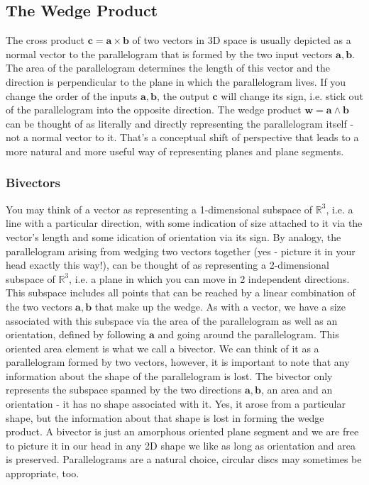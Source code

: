 \subsection{The Wedge Product}
The cross product $\mathbf{c = a \times b}$ of two vectors in 3D space is usually depicted as a normal vector to the parallelogram that is formed by the two input vectors $\mathbf{a,b}$. The area of the parallelogram determines the length of this vector and the direction is perpendicular to the plane in which the parallelogram lives. If you change the order of the inputs $\mathbf{a,b}$, the output  $\mathbf{c}$ will change its sign, i.e. stick out of the parallelogram into the opposite direction. The wedge product $\mathbf{w = a \wedge b}$ can be thought of as literally and directly representing the parallelogram itself - not a normal vector to it. That's a conceptual shift of perspective that leads to a more natural and more useful way of representing planes and plane segments.

\subsubsection{Bivectors}
You may think of a vector as representing a 1-dimensional subspace of $\mathbb{R}^3$, i.e. a line with a particular direction, with some indication of size attached to it via the vector's length and some idication of orientation via its sign. By analogy, the parallelogram arising from wedging two vectors together (yes - picture it in your head exactly this way!), can be thought of as representing a 2-dimensional subspace of $\mathbb{R}^3$, i.e. a plane in which you can move in 2 independent directions. This subspace includes all points that can be reached by a linear combination of the two vectors $\mathbf{a,b}$ that make up the wedge. As with a vector, we have a size associated with this subspace via the area of the parallelogram as well as an orientation, defined by following $\mathbf{a}$ and going around the parallelogram. This oriented area element is what we call a bivector. We can think of it as a parallelogram formed by two vectors, however, it is important to note that any information about the shape of the parallelogram is lost. The bivector only represents the subspace spanned by the two directions $\mathbf{a,b}$, an area and an orientation - it has no shape associated with it. Yes, it arose from a particular shape, but the information about that shape is lost in forming the wedge product. A bivector is just an amorphous oriented plane segment and we are free to picture it in our head in any 2D shape we like as long as orientation and area is preserved. Parallelograms are a natural choice, circular discs may sometimes be appropriate, too.

